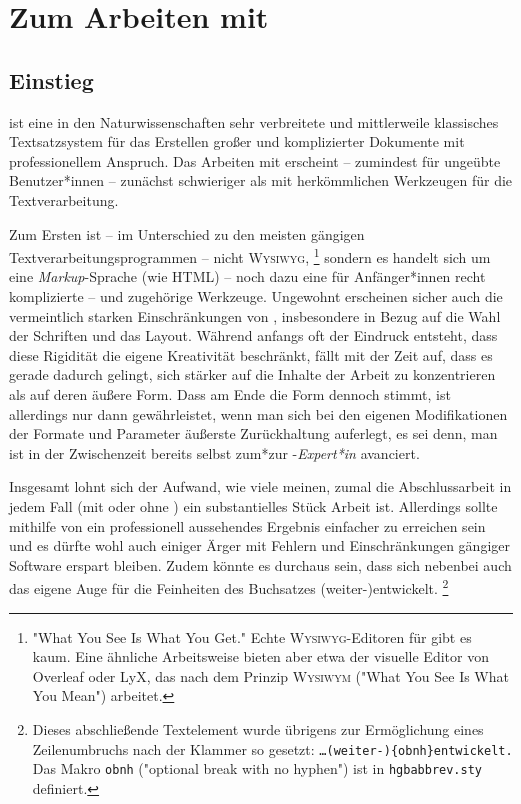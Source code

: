 \chapter{Zum Arbeiten mit \latex}
\label{cha:ArbeitenMitLatex}


\section{Einstieg}
\label{sec:LatexEinstieg}

\latex ist eine in den Naturwissenschaften sehr verbreitete und mittlerweile
klassisches Textsatzsystem für das Erstellen großer und
komplizierter Dokumente mit professionellem Anspruch. Das Arbeiten mit \latex
erscheint -- zumindest für ungeübte Benutzer*innen -- zunächst schwieriger
als mit herkömmlichen Werkzeugen für die Textverarbeitung.

Zum Ersten ist -- im Unterschied zu den meisten gängigen
Text\-ver\-arbei\-tungs\-prog\-ram\-men -- \latex nicht \textsc{Wysiwyg},%
\footnote{"What You See Is What You Get." Echte \textsc{Wysiwyg}-Editoren
für \latex gibt es kaum. Eine ähnliche Arbeitsweise bieten aber etwa der
visuelle Editor von \textsf{Overleaf} oder \textsf{LyX}, das nach dem Prinzip
\textsc{Wysiwym} ("What You See Is What You Mean") arbeitet.}
sondern es handelt sich um eine \emph{Markup}-Sprache (wie HTML) -- noch
dazu eine für Anfänger*innen recht komplizierte -- und zugehörige Werkzeuge.
Ungewohnt erscheinen sicher auch die vermeintlich starken Einschränkungen von
\latex, insbesondere in Bezug auf die Wahl der Schriften und das Layout.
Während anfangs oft der Eindruck entsteht, dass diese Rigidität die eigene
Kreativität beschränkt, fällt mit der Zeit auf, dass es gerade dadurch
gelingt, sich stärker auf die Inhalte der Arbeit zu konzentrieren als auf
deren äußere Form. Dass am Ende die Form dennoch stimmt, ist allerdings nur
dann gewährleistet, wenn man sich bei den eigenen Modifikationen der Formate
und Parameter äußerste Zurückhaltung auferlegt, es sei denn, man ist in der
Zwischenzeit bereits selbst zum*zur \latex-\emph{Expert*in} avanciert.

Insgesamt lohnt sich der Aufwand, wie viele meinen, zumal die Abschlussarbeit
in jedem Fall (mit oder ohne \latex) ein substantielles Stück Arbeit ist.
Allerdings sollte mithilfe von \latex ein professionell aussehendes Ergebnis
einfacher zu erreichen sein und es dürfte wohl auch einiger Ärger mit Fehlern
und Einschränkungen gängiger Software erspart bleiben. Zudem könnte es
durchaus sein, dass sich nebenbei auch das eigene Auge für die Feinheiten des
Buchsatzes (weiter-){\obnh}entwickelt.%
\footnote{Dieses abschließende Textelement wurde übrigens zur Ermöglichung
eines Zeilenumbruchs nach der Klammer so gesetzt:
\texttt{\ldots (weiter-)\{{\bs}obnh\}entwickelt.} Das Makro
\texttt{{\bs}obnh} ("optional break with no hyphen") ist in
\texttt{hgbabbrev.sty} definiert.}

